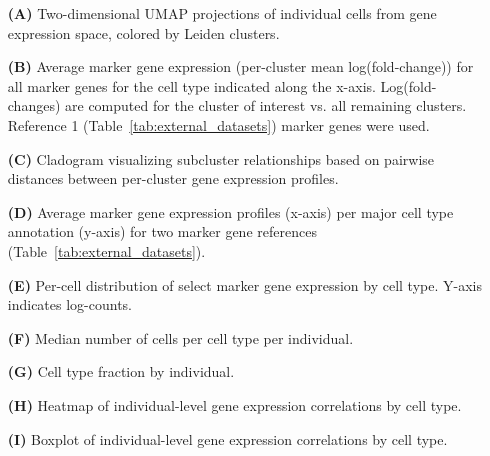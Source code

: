 \documentclass[12pt]{article}
\begin{document}
\begin{itemize}
    \item[\textbf{(A)}] Two-dimensional UMAP projections of individual cells from gene expression space, colored by Leiden clusters. 
    \item[\textbf{(B)}] Average marker gene expression (per-cluster mean log(fold-change)) for all marker genes for the cell type indicated along the x-axis. Log(fold-changes) are computed for the cluster of interest vs. all remaining clusters. Reference 1 (Table~\ref{tab:external_datasets}) marker genes were used. 
    \item[\textbf{(C)}] Cladogram visualizing subcluster relationships based on pairwise distances between per-cluster gene expression profiles. 
    \item[\textbf{(D)}] Average marker gene expression profiles (x-axis) per major cell type annotation (y-axis) for two marker gene references (Table~\ref{tab:external_datasets}). 
    \item[\textbf{(E)}] Per-cell distribution of select marker gene expression by cell type. Y-axis indicates log-counts. 
    \item[\textbf{(F)}] Median number of cells per cell type per individual. 
    \item[\textbf{(G)}] Cell type fraction by individual. 
    \item[\textbf{(H)}] Heatmap of individual-level gene expression correlations by cell type. 
    \item[\textbf{(I)}] Boxplot of individual-level gene expression correlations by cell type. 
\end{itemize} \clearpage
\end{document}
